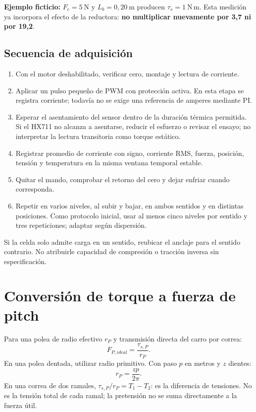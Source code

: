 \documentclass[11pt,a4paper]{article}
\begin{document}
\textbf{Ejemplo ficticio:} $F_c=5\ \mathrm{N}$ y $L_b=0{,}20\ \mathrm{m}$ producen $\tau_s=1\ \mathrm{N\,m}$. Esta medición ya incorpora el efecto de la reductora: \textbf{no multiplicar nuevamente por 3,7 ni por 19,2}.

\subsection{Secuencia de adquisición}
\begin{enumerate}
\item Con el motor deshabilitado, verificar cero, montaje y lectura de corriente.
\item Aplicar un pulso pequeño de PWM con protección activa. En esta etapa se registra corriente; todavía no se exige una referencia de amperes mediante PI.
\item Esperar el asentamiento del sensor dentro de la duración térmica permitida. Si el HX711 no alcanza a asentarse, reducir el esfuerzo o revisar el ensayo; no interpretar la lectura transitoria como torque estático.
\item Registrar promedio de corriente con signo, corriente RMS, fuerza, posición, tensión y temperatura en la misma ventana temporal estable.
\item Quitar el mando, comprobar el retorno del cero y dejar enfriar cuando corresponda.
\item Repetir en varios niveles, al subir y bajar, en ambos sentidos y en distintas posiciones. Como protocolo inicial, usar al menos cinco niveles por sentido y tres repeticiones; adaptar según dispersión.
\end{enumerate}
Si la celda solo admite carga en un sentido, reubicar el anclaje para el sentido contrario. No atribuirle capacidad de compresión o tracción inversa sin especificación.

\section{Conversión de torque a fuerza de pitch}
Para una polea de radio efectivo $r_P$ y transmisión directa del carro por correa:
\begin{equation}
\boxed{F_{P,ideal}=\frac{\tau_{s,P}}{r_P}.}
\end{equation}
En una polea dentada, utilizar radio primitivo. Con paso $p$ en metros y $z$ dientes:
\begin{equation}
r_P=\frac{zp}{2\pi}.
\end{equation}
En una correa de dos ramales, $\tau_{s,P}/r_P=T_1-T_2$: es la diferencia de tensiones. No es la tensión total de cada ramal; la pretensión no se suma directamente a la fuerza útil.
\end{document}
